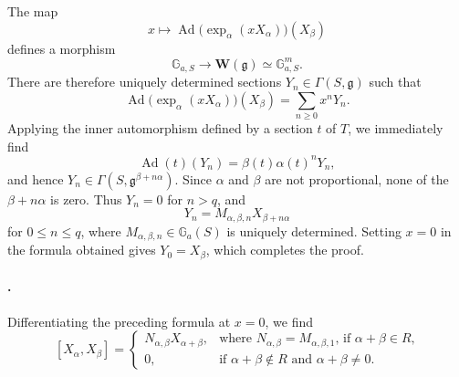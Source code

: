The map
\[
  x\longmapsto
  \operatorname{Ad}\bigl(\exp_\alpha(xX_\alpha)\bigr)(X_\beta)
\]
defines a morphism
\[
  \mathbb G_{a,S}\longrightarrow
  \mathbf W(\mathfrak g)\simeq\mathbb G_{a,S}^{m}.
\]
There are therefore uniquely determined sections
\(Y_n\in\Gamma(S,\mathfrak g)\) such that
\[
  \operatorname{Ad}\bigl(\exp_\alpha(xX_\alpha)\bigr)(X_\beta)
  =
  \sum_{n\geq0}x^nY_n.
\]
Applying the inner automorphism defined by a section \(t\) of
\(T\), we immediately find
\[
  \operatorname{Ad}(t)(Y_n)
  =
  \beta(t)\alpha(t)^nY_n,
\]
and hence \(Y_n\in\Gamma(S,\mathfrak g^{\beta+n\alpha})\). Since
\(\alpha\) and \(\beta\) are not proportional, none of the
\(\beta+n\alpha\) is zero. Thus \(Y_n=0\) for \(n>q\), and
\[
  Y_n=M_{\alpha,\beta,n}X_{\beta+n\alpha}
\]
for \(0\leq n\leq q\), where
\(M_{\alpha,\beta,n}\in\mathbb G_a(S)\) is uniquely determined.
Setting \(x=0\) in the formula obtained gives \(Y_0=X_\beta\),
which completes the proof.

\paragraph{.}
Differentiating the preceding formula at \(x=0\), we find
\[
  [X_\alpha,X_\beta]
  =
  \begin{cases}
    N_{\alpha,\beta}X_{\alpha+\beta},
      &\text{where \(N_{\alpha,\beta}=M_{\alpha,\beta,1}\), if
        \(\alpha+\beta\in R\),}\\
    0,
      &\text{if \(\alpha+\beta\notin R\) and
        \(\alpha+\beta\ne0\).}
  \end{cases}
\]

